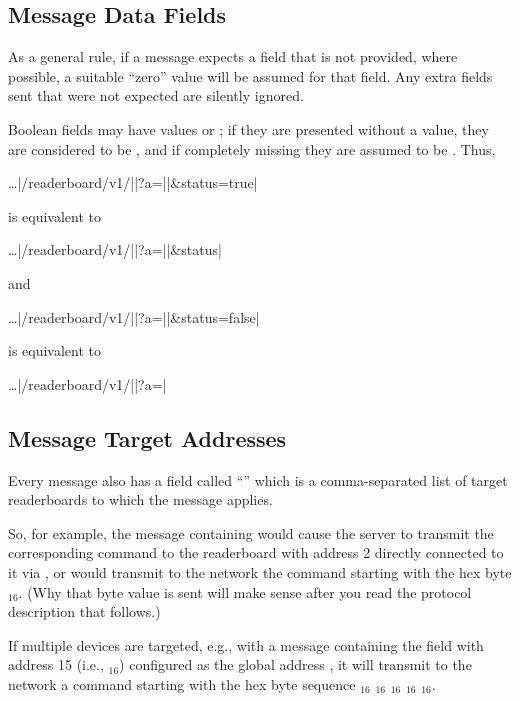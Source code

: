 \subsection{Message Data Fields}
As a general rule, if a message expects a field that is not provided, where possible, a suitable ``zero'' value will be assumed
for that field. Any extra fields sent that were not expected are silently ignored.

Boolean fields may have values  or ; if they are presented without a value, they are considered to be
, and if completely missing they are assumed to be . Thus,

\begin{Coding}
	\dots|/readerboard/v1/||?a=||&status=true|
\end{Coding}

\noindent is equivalent to

\begin{Coding}
	\dots|/readerboard/v1/||?a=||&status|
\end{Coding}

\noindent and

\begin{Coding}
	\dots|/readerboard/v1/||?a=||&status=false|
\end{Coding}

\noindent is equivalent to

\begin{Coding}
	\dots|/readerboard/v1/||?a=|
\end{Coding}

\subsection{Message Target Addresses}
Every message also has a field called ``'' which is a comma-separated list of target readerboards to which the message
applies.

So, for example, the message containing  would cause the server to transmit the corresponding command to the readerboard with address 2 directly connected to it via , or
would transmit to the  network the command starting with the hex byte $_{16}$. (Why that byte value is sent will make sense after you read the protocol
description that follows.)

If multiple devices are targeted, e.g., with a message containing the field  with address 15 (i.e., $_{16}$) configured as the global address ,
it will transmit to the  network a command starting with the hex byte sequence $_{16}$ $_{16}$ $_{16}$ $_{16}$ $_{16}$.
